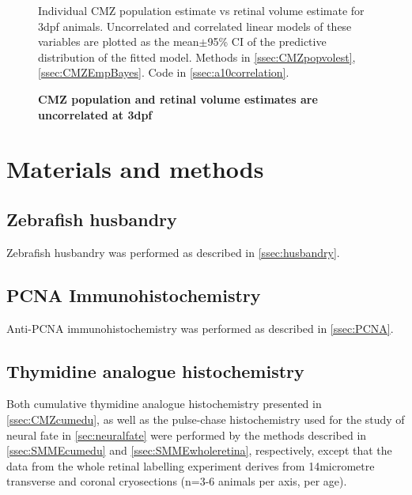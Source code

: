 \documentclass{ut-thesis}
\begin{document}
\begin{NoHyper}
\begin{figure}[!h]
    \caption{{\bf CMZ population and retinal volume estimates are uncorrelated at 3dpf}}
    Individual CMZ population estimate vs retinal volume estimate for 3dpf animals. Uncorrelated and correlated linear models of these variables are plotted as the mean$\pm$95\% CI of the predictive distribution of the fitted model. 
    Methods in \autoref{ssec:CMZpopvolest}, \autoref{ssec:CMZEmpBayes}.
    Code in \autoref{ssec:a10correlation}.
    \label{gausscorrelation}
\end{figure}

\section{Materials and methods}
\subsection{Zebrafish husbandry}
Zebrafish husbandry was performed as described in \autoref{ssec:husbandry}.
\subsection{PCNA Immunohistochemistry}
Anti-PCNA immunohistochemistry was performed as described in \autoref{ssec:PCNA}.
\subsection{Thymidine analogue histochemistry}
\label{ssec:CMZEdU}
Both cumulative thymidine analogue histochemistry presented in \autoref{ssec:CMZcumedu}, as well as the pulse-chase histochemistry used for the study of neural fate in \autoref{sec:neuralfate} were performed by the methods described in \autoref{ssec:SMMEcumedu} and \autoref{ssec:SMMEwholeretina}, respectively, except that the data from the whole retinal labelling experiment derives from 14\si{micro}{metre} transverse and coronal cryosections (n=3-6 animals per axis, per age). 


\end{NoHyper}
\end{document}
